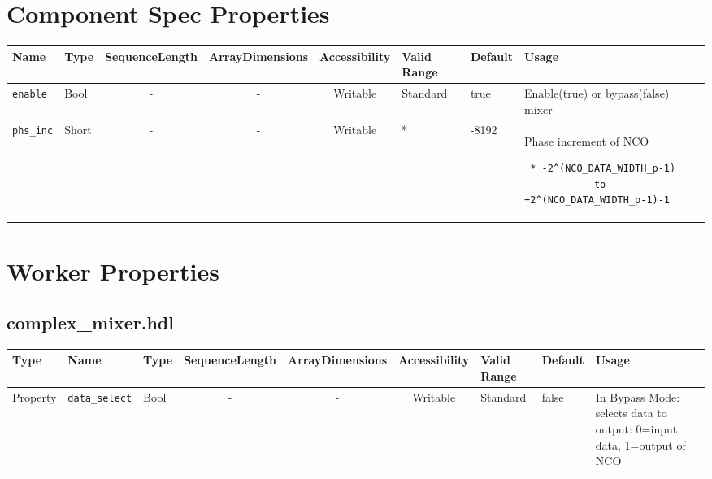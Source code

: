 \documentclass{article}
\def\comp{complex\_mixer}
\begin{document}
\begin{landscape}
	\section*{Component Spec Properties}
	\begin{scriptsize}
		\begin{tabular}{|p{3cm}|p{1.5cm}|c|c|c|p{1.5cm}|p{1cm}|p{7cm}|}
			\hline
			\rowcolor{blue}
			Name               & Type   & SequenceLength & ArrayDimensions & Accessibility      & Valid Range & Default & Usage                                                                         \\
			\hline
			\verb+enable+      & Bool   & -              & -               & Writable & Standard    & true    & Enable(true) or bypass(false) mixer                                           \\
			\hline
			\verb+phs_inc+     & Short  & -              & -               & Writable & *           & -8192   & Phase increment of NCO \scriptsize\begin{verbatim} * -2^(NCO_DATA_WIDTH_p-1)
			to +2^(NCO_DATA_WIDTH_p-1)-1\end{verbatim}\\
			\hline

		\end{tabular}
	\end{scriptsize}

	\section*{Worker Properties}
	\subsection*{\comp.hdl}
	\begin{scriptsize}
		\begin{tabular}{|p{1.5cm}|p{2.5cm}|p{1cm}|c|c|c|p{2cm}|p{1cm}|p{5cm}|}
			\hline
			\rowcolor{blue}
			Type     & Name                      & Type  & SequenceLength & ArrayDimensions & Accessibility       & Valid Range & Default & Usage                                      \\
			\hline
			Property & \verb+data_select+     & Bool  & -              & -               & Writable & Standard    & false    & In Bypass Mode: selects data to output: 0=input data, 1=output of NCO   \\
			\hline
		\end{tabular}
	\end{scriptsize}


\end{landscape}
\end{document}
